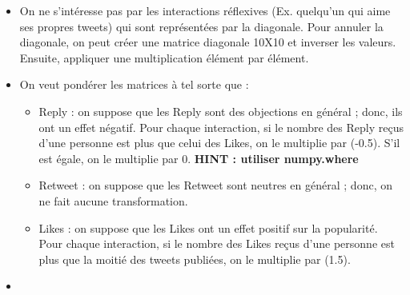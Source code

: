 \documentclass[11pt, a4paper]{article}
\begin{document}
\begin{itemize}
	\item On ne s'intéresse pas par les interactions réflexives (Ex. quelqu'un qui aime ses propres tweets) qui sont représentées par la diagonale. 
	Pour annuler la diagonale, on peut créer une matrice diagonale 10X10 et inverser les valeurs.
	Ensuite, appliquer une multiplication élément par élément.
	\item On veut pondérer les matrices à tel sorte que :
	\begin{itemize}
		\item Reply : on suppose que les Reply sont des objections en général ; donc, ils ont un effet négatif. 
		Pour chaque interaction, si le nombre des Reply reçus d'une personne est plus que celui des Likes, on le multiplie par (-0.5). S'il est égale, on le multiplie par 0. \textbf{HINT : utiliser numpy.where}
		\item Retweet : on suppose que les Retweet sont neutres en général ; donc, on ne fait aucune transformation.
		\item Likes : on suppose que les Likes ont un effet positif sur la popularité.
		Pour chaque interaction, si le nombre des Likes reçus d'une personne est plus que la moitié des tweets publiées, on le multiplie par (1.5).
	\end{itemize}
	\item 

\end{itemize}
\end{document}
